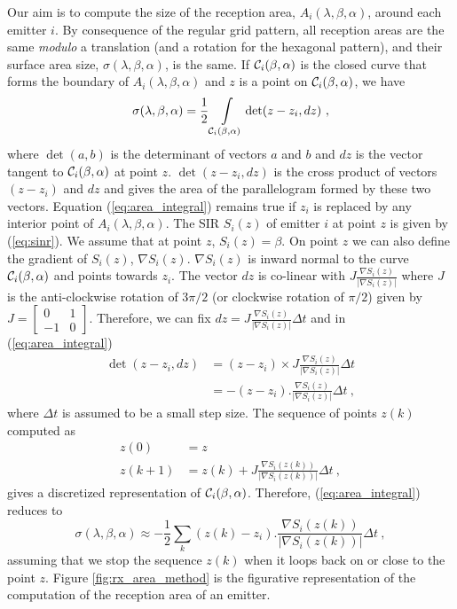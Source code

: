 \documentclass[12pt,english]{article}
\begin{document}
Our aim is to compute the size of the reception area, $A_i(\lambda,\beta,\alpha)$, around each emitter $i$. By consequence of the regular grid pattern, all reception areas are the same {\em modulo} a translation (and a rotation for the hexagonal pattern), and their surface area size, $\sigma(\lambda,\beta,\alpha)$, is the same.  If ${\cal C}_i(\beta,\alpha)$ is the closed curve that forms the boundary of $A_i(\lambda,\beta,\alpha)$ and $z$ is a point on ${\cal C}_i(\beta,\alpha)$, we have
\begin{equation}
\sigma(\lambda, \beta,\alpha)=\frac{1}{2}\displaystyle\int\limits_{{\cal C}_i(\beta,\alpha)}\det(z-z_{i},dz)~,
\label{eq:area_integral}
\end{equation}
where $\det(a,b)$ is the determinant of vectors $a$ and $b$ and $dz$ is the vector tangent to ${\cal C}_i(\beta,\alpha)$ at point $z$. \mbox{$\det(z-z_i,dz)$} is the cross product of vectors $(z-z_{i})$ and $dz$ and gives the area of the parallelogram formed by these two vectors. Equation (\ref{eq:area_integral}) remains true if $z_{i}$ is replaced by any interior point of $A_i(\lambda,\beta,\alpha)$. The SIR $S_{i}(z)$ of emitter $i$ at point $z$ is given by (\ref{eq:sinr}). We assume that at point $z$, $S_{i}(z)=\beta$. On point $z$ we can also define the gradient of $S_{i}(z)$, $\nabla S_{i}(z)$.
$\nabla S_i(z)$ is inward normal to the curve ${\cal C}_i(\beta,\alpha)$ and points towards $z_i$. The vector $dz$ is co-linear with $J\frac{\nabla S_{i}(z)}{|\nabla S_{i}(z)|}$ where $J$ is the anti-clockwise rotation of $3\pi/2$ (or clockwise rotation of $\pi/2$) given by
$
J=\left[\begin{array}{cc}
0 & 1\\
-1 & 0\end{array}\right]
$. 
Therefore, we can fix $dz=J\frac{\nabla S_{i}(z)}{|\nabla S_{i}(z)|}\Delta t$ and in (\ref{eq:area_integral}) 
\begin{align*}
\det(z-z_{i},dz)&=(z-z_i)\times J\frac{\nabla S_{i}(z)}{|\nabla S_{i}(z)|}\Delta t\\
&=-(z-z_{i}).\frac{\nabla S_{i}(z)}{|\nabla S_{i}(z)|}\Delta t~,
\end{align*}
where $\Delta t$ is assumed to be a small step size. The sequence of points $z(k)$ computed as 
\begin{align*}
z(0) & =z\\
z(k+1) & =z(k)+J\frac{\nabla S_{i}(z(k))}{|\nabla S_{i}(z(k))|}\Delta t~,\end{align*} gives a discretized representation of ${\cal C}_i(\beta,\alpha)$. 
Therefore, (\ref{eq:area_integral}) reduces to
\begin{equation}
\sigma(\lambda, \beta,\alpha)\approx-\frac{1}{2}\sum_{k}(z(k)-z_{i}).\frac{\nabla S_{i}(z(k))}{|\nabla S_{i}(z(k))|}\Delta t~,
\label{eq:area_integral_2}
\end{equation}
assuming that we stop the sequence $z(k)$ when it loops back on or close to the point $z$. Figure \ref{fig:rx_area_method} is the figurative representation of the computation of the reception area of an emitter. 
\end{document}
